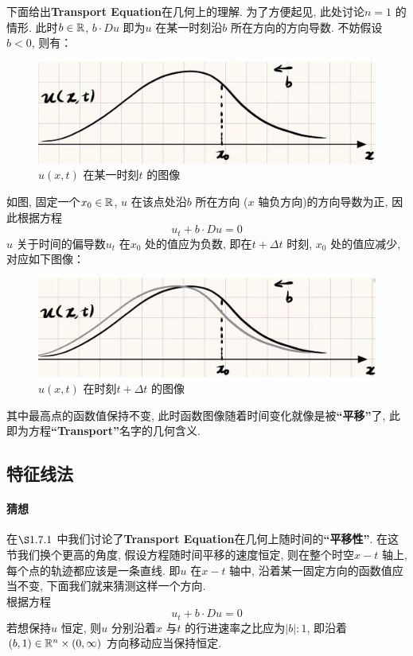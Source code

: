 	\vspace*{4em}
	
	下面给出\textbf{Transport Equation}在几何上的理解. 为了方便起见, 此处讨论$n = 1$ 的情形. 此时$b \in \mathbb{R}$, $b \cdot Du$ 即为$u$ 在某一时刻沿$b$ 所在方向的方向导数. 不妨假设$b < 0$, 则有：
	
	\begin{figure}[thbp!]
		\centering
		\includegraphics[width=0.5\linewidth]{figure/1.7.1-1}
		\caption{$u(x , t)$ 在某一时刻$t$ 的图像}
		\label{pic : 1.7.1-1} %
	\end{figure}
	
	如图, 固定一个$x_0 \in \mathbb{R}$, $u$ 在该点处沿$b$ 所在方向 ($x$ 轴负方向)的方向导数为正, 因此根据方程
	\[ u_t + b \cdot Du = 0 \]
	$u$ 关于时间的偏导数$u_t$ 在$x_0$ 处的值应为负数, 即在$t + \Delta t$ 时刻, $x_0$ 处的值应减少, 对应如下图像：
	
	\begin{figure}[thbp!]
		\centering
		\includegraphics[width=0.5\linewidth]{figure/1.7.1-2}
		\caption{$u(x , t)$ 在时刻$t + \Delta t$ 的图像}
		\label{pic : 1.7.1-2} %
	\end{figure}
	
	其中最高点的函数值保持不变, 此时函数图像随着时间变化就像是被\textbf{“平移”}了, 此即为方程\textbf{“Transport”}名字的几何含义.
	
\newpage

\subsection{特征线法}
\paragraph{猜想}
	在$\S 1.7.1$ 中我们讨论了\textbf{Transport Equation}在几何上随时间的\textbf{“平移性”}. 在这节我们换个更高的角度, 假设方程随时间平移的速度恒定, 则在整个时空$x-t$ 轴上, 每个点的轨迹都应该是一条直线. 即$u$ 在$x-t$ 轴中, 沿着某一固定方向的函数值应当不变, 下面我们就来猜测这样一个方向. \\
	根据方程
	\[ u_t + b \cdot Du = 0 \]
	若想保持$u$ 恒定, 则$u$ 分别沿着$x$ 与$t$ 的行进速率之比应为$\left| b \right| : 1$, 即沿着$(b , 1) \in \mathbb{R}^n \times (0 , \infty)$ 方向移动应当保持恒定. 
	
